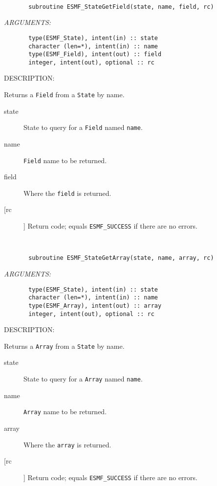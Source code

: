 {\mbox{}\hrulefill\ 
 

\begin{verbatim}       subroutine ESMF_StateGetField(state, name, field, rc)\end{verbatim}{\em ARGUMENTS:}
\begin{verbatim}       type(ESMF_State), intent(in) :: state
       character (len=*), intent(in) :: name
       type(ESMF_Field), intent(out) :: field
       integer, intent(out), optional :: rc             
 \end{verbatim}
{\sf DESCRIPTION:\\ }


        Returns a {\tt Field} from a {\tt State} by name.
  
    \begin{description}     
    \item[state]
      State to query for a {\tt Field} named {\tt name}.
    \item[name]
      {\tt Field} name to be returned.
    \item[field]
      Where the {\tt field} is returned.
    \item[[rc]]
      Return code; equals {\tt ESMF\_SUCCESS} if there are no errors.
    \end{description}
  
   
 
\mbox{}\hrulefill\ 
 

\begin{verbatim}       subroutine ESMF_StateGetArray(state, name, array, rc)\end{verbatim}{\em ARGUMENTS:}
\begin{verbatim}       type(ESMF_State), intent(in) :: state
       character (len=*), intent(in) :: name
       type(ESMF_Array), intent(out) :: array
       integer, intent(out), optional :: rc             
 \end{verbatim}
{\sf DESCRIPTION:\\ }


        Returns a {\tt Array} from a {\tt State} by name.
  
    \begin{description}     
    \item[state]
      State to query for a {\tt Array} named {\tt name}.
    \item[name]
      {\tt Array} name to be returned.
    \item[array]
      Where the {\tt array} is returned.
    \item[[rc]]
      Return code; equals {\tt ESMF\_SUCCESS} if there are no errors.
    \end{description}
  
}
